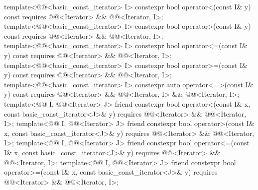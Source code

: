 \begin{codeblock}
{{    template<@@<basic_const_iterator> I>
      constexpr bool operator<(const I& y) const
        requires @@<Iterator> && @@<Iterator, I>;
    template<@@<basic_const_iterator> I>
      constexpr bool operator>(const I& y) const
        requires @@<Iterator> && @@<Iterator, I>;
    template<@@<basic_const_iterator> I>
      constexpr bool operator<=(const I& y) const
        requires @@<Iterator> && @@<Iterator, I>;
    template<@@<basic_const_iterator> I>
      constexpr bool operator>=(const I& y) const
        requires @@<Iterator> && @@<Iterator, I>;
    template<@@<basic_const_iterator> I>
      constexpr auto operator<=>(const I& y) const
        requires @@<Iterator> && @@<Iterator, I> &&
                 @@<Iterator, I>;
    template<@@ I, @@<Iterator> J>
      friend constexpr bool operator<(const I& x, const basic_const_iterator<J>& y)
        requires @@<Iterator> && @@<Iterator, I>;
    template<@@ I, @@<Iterator> J>
      friend constexpr bool operator>(const I& x, const basic_const_iterator<J>& y)
        requires @@<Iterator> && @@<Iterator, I>;
    template<@@ I, @@<Iterator> J>
      friend constexpr bool operator<=(const I& x, const basic_const_iterator<J>& y)
        requires @@<Iterator> && @@<Iterator, I>;
    template<@@ I, @@<Iterator> J>
      friend constexpr bool operator>=(const I& x, const basic_const_iterator<J>& y)
        requires @@<Iterator> && @@<Iterator, I>;

}}
\end{codeblock}
